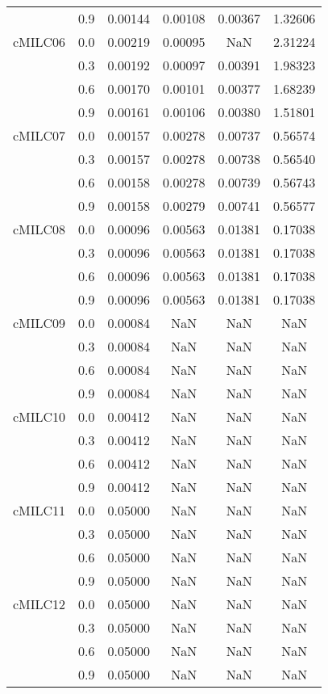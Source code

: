 \begin{longtable}{cccccc}
        & 0.9 & 0.00144 & 0.00108 & 0.00367 & 1.32606 \\
cMILC06 & 0.0 & 0.00219 & 0.00095 & NaN & 2.31224 \\
        & 0.3 & 0.00192 & 0.00097 & 0.00391 & 1.98323 \\
        & 0.6 & 0.00170 & 0.00101 & 0.00377 & 1.68239 \\
        & 0.9 & 0.00161 & 0.00106 & 0.00380 & 1.51801 \\
cMILC07 & 0.0 & 0.00157 & 0.00278 & 0.00737 & 0.56574 \\
        & 0.3 & 0.00157 & 0.00278 & 0.00738 & 0.56540 \\
        & 0.6 & 0.00158 & 0.00278 & 0.00739 & 0.56743 \\
        & 0.9 & 0.00158 & 0.00279 & 0.00741 & 0.56577 \\
cMILC08 & 0.0 & 0.00096 & 0.00563 & 0.01381 & 0.17038 \\
        & 0.3 & 0.00096 & 0.00563 & 0.01381 & 0.17038 \\
        & 0.6 & 0.00096 & 0.00563 & 0.01381 & 0.17038 \\
        & 0.9 & 0.00096 & 0.00563 & 0.01381 & 0.17038 \\
cMILC09 & 0.0 & 0.00084 & NaN & NaN & NaN \\
        & 0.3 & 0.00084 & NaN & NaN & NaN \\
        & 0.6 & 0.00084 & NaN & NaN & NaN \\
        & 0.9 & 0.00084 & NaN & NaN & NaN \\
cMILC10 & 0.0 & 0.00412 & NaN & NaN & NaN \\
        & 0.3 & 0.00412 & NaN & NaN & NaN \\
        & 0.6 & 0.00412 & NaN & NaN & NaN \\
        & 0.9 & 0.00412 & NaN & NaN & NaN \\
cMILC11 & 0.0 & 0.05000 & NaN & NaN & NaN \\
        & 0.3 & 0.05000 & NaN & NaN & NaN \\
        & 0.6 & 0.05000 & NaN & NaN & NaN \\
        & 0.9 & 0.05000 & NaN & NaN & NaN \\
cMILC12 & 0.0 & 0.05000 & NaN & NaN & NaN \\
        & 0.3 & 0.05000 & NaN & NaN & NaN \\
        & 0.6 & 0.05000 & NaN & NaN & NaN \\
        & 0.9 & 0.05000 & NaN & NaN & NaN \\
\end{longtable}
